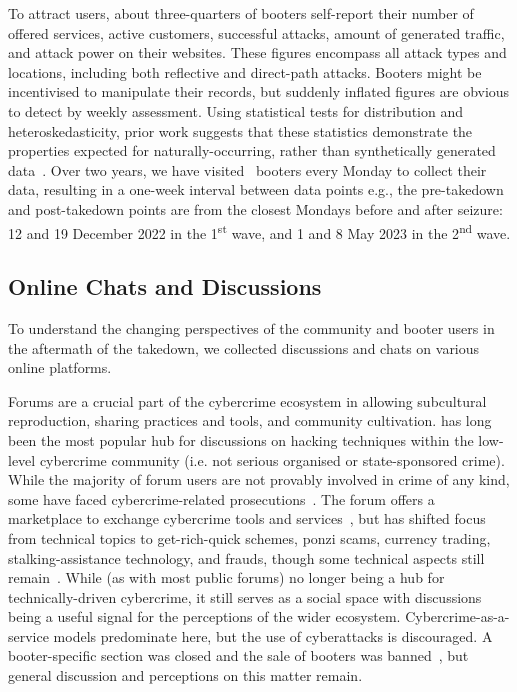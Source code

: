 \documentclass[letterpaper,twocolumn,10pt]{article}
\begin{document}
 To attract users, about three-quarters of booters self-report their number of offered services, active customers, successful attacks, amount of generated traffic, and attack power on their websites. These figures encompass all attack types and locations, including both reflective and direct-path attacks. Booters might be incentivised to manipulate their records, but suddenly inflated figures are obvious to detect by weekly assessment. Using statistical tests for distribution and heteroskedasticity, prior work suggests that these statistics demonstrate the properties expected for naturally-occurring, rather than synthetically generated data~\cite{collier2019booting}. Over two years, we have visited \BTnSelfReportedBooters~booters every Monday to collect their data, resulting in a one-week interval between data points e.g., the pre-takedown and post-takedown points are from the closest Mondays before and after seizure: 12 and 19 December 2022 in the 1\textsuperscript{st} wave, and 1 and 8 May 2023 in the 2\textsuperscript{nd} wave.

\subsection{Online Chats and Discussions}
To understand the changing perspectives of the community and booter users in the aftermath of the takedown, we collected discussions and chats on various online platforms.

 Forums are a crucial part of the cybercrime ecosystem in allowing subcultural reproduction, sharing practices and tools, and community cultivation. \hackforums has long been the most popular hub for discussions on hacking techniques within the low-level cybercrime community (i.e. not serious organised or state-sponsored crime). While the majority of forum users are not provably involved in crime of any kind, some have faced cybercrime-related prosecutions~\cite{pastrana2018characterizing}. The forum offers a marketplace to exchange cybercrime tools and services~\cite{vu2020turning,marjanov2024breaking}, but has shifted focus from technical topics to get-rich-quick schemes, ponzi scams, currency trading, stalking-assistance technology, and frauds, though some technical aspects still remain~\cite{hughes2023digital}. While (as with most public forums) no longer being a hub for technically-driven cybercrime, it still serves as a social space with discussions being a useful signal for the perceptions of the wider ecosystem. Cybercrime-as-a-service models predominate here, but the use of cyberattacks is discouraged. A booter-specific section was closed and the sale of booters was banned~\cite{collier2019booting}, but general discussion and perceptions on this matter remain.
\end{document}
